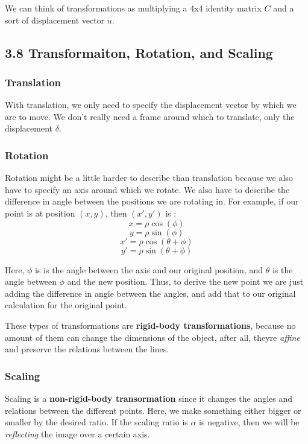\documentclass{article}
\begin{document}
We can think of transformations as multiplying a 4x4 identity matrix $C$ and a sort of displacement vector $u$.
	\subsection{3.8 Transformaiton, Rotation, and Scaling}

		\subsubsection{Translation}
			With translation, we only need to specify the displacement vector by which we are to move. We don't really need 
			a frame around which to translate, only the displacement $\delta$.
		\subsubsection{Rotation}
			Rotation might be a little harder to describe than translation because we also have to specify an axis around 
			which we rotate. We also have to describe the difference in angle between the positions we are rotating in.
			For example, if our point is at position $(x,y)$, then $(x', y')$ is :
			\[ x=\rho\cos(\phi)\]
			\[ y=\rho\sin(\phi)\]
			\[ x'=\rho\cos(\theta + \phi)\]
			\[ y'=\rho\sin(\theta + \phi)\]

			Here, $\phi$ is is the angle between the axis and our original position, and $\theta$ is the angle between $\phi$
			and the new position. Thus, to derive the new point we are just adding the difference in angle between the angles, 
			and add that to our original calculation for the original point.
			
			These types of transformations are \textbf{rigid-body transformations}, because no amount of them can change the 
			dimensions of the object, after all, theyre \textit{affine} and preserve the relations between the lines.
		\subsubsection{Scaling}
			Scaling is a \textbf{non-rigid-body transormation} since it changes the angles and relations between the different
			points. Here, we make something either bigger or smaller by the desired ratio. If the scaling ratio is $\alpha$ is
			negative, then we will be \textit{reflecting} the image over a certain axis.
\end{document}
